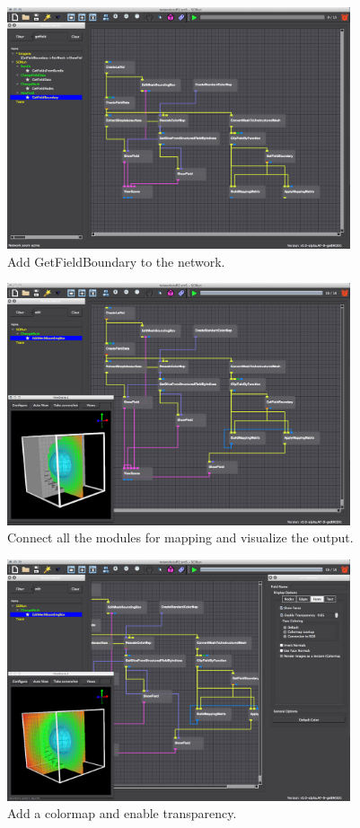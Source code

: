 \documentclass[fleqn,11pt,openany]{book}
\begin{document}
\begin{figure}[H]
\center
\includegraphics[width=0.9\textwidth]{BasicTutorial_figures/fieldboundary.png}
\caption{Add GetFieldBoundary to the network.}
\label{fig:highlightmods}
\end{figure}

\begin{figure}[H]
\center
\includegraphics[width=0.9\textwidth]{BasicTutorial_figures/view_boundary.png}
\caption{Connect all the modules for mapping and visualize the output.}
\label{fig:viewbound}
\end{figure}

\begin{figure}[H]
\center
\includegraphics[width=0.9\textwidth]{BasicTutorial_figures/finalview.png}
\caption{Add a colormap and enable transparency.}
\label{fig:finalview}
\end{figure}
\end{document}
